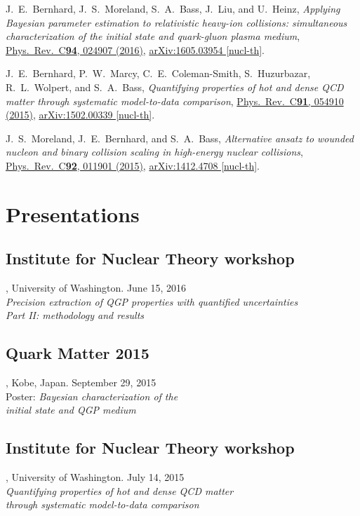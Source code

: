 \documentclass[letterpaper,10pt]{article}
\begin{document}
J.~E.~Bernhard, J.~S.~Moreland, S.~A.~Bass, J.~Liu, and U.~Heinz,
\emph{Applying Bayesian parameter estimation to relativistic heavy-ion collisions: simultaneous characterization of the initial state and quark-gluon plasma medium},
\href{http://dx.doi.org/10.1103/PhysRevC.94.024907}{Phys.\ Rev.\ C{\bf 94}, 024907 (2016)},
\href{https://arxiv.org/abs/1605.03954}{arXiv:1605.03954 [nucl-th]}.

\vspace{1em}

J.~E.~Bernhard, P.~W.~Marcy, C.~E.~Coleman-Smith, S.~Huzurbazar, R.~L.~Wolpert, and S.~A.~Bass,
\emph{Quantifying properties of hot and dense QCD matter through systematic model-to-data comparison},
\href{http://dx.doi.org/10.1103/PhysRevC.91.054910}{Phys.\ Rev.\ C{\bf 91}, 054910 (2015)},
\href{http://arxiv.org/abs/1502.00339}{arXiv:1502.00339 [nucl-th]}.

\vspace{1em}

J.~S.~Moreland, J.~E.~Bernhard, and S.~A.~Bass,
\emph{Alternative ansatz to wounded nucleon and binary collision scaling in high-energy nuclear collisions},
\href{http://dx.doi.org/10.1103/PhysRevC.92.011901}{Phys.\ Rev.\ C{\bf 92}, 011901 (2015)},
\href{http://arxiv.org/abs/1412.4708}{arXiv:1412.4708 [nucl-th]}.



\section{Presentations}


\subsection{Institute for Nuclear Theory workshop}, University of Washington. \hfill June 15, 2016 \\
\emph{Precision extraction of QGP properties with quantified uncertainties \\ Part II: methodology and results}

\subsection{Quark Matter 2015}, Kobe, Japan. \hfill September 29, 2015 \\
Poster: \emph{Bayesian characterization of the \\ initial state and QGP medium}

\subsection{Institute for Nuclear Theory workshop}, University of Washington. \hfill July 14, 2015 \\
\emph{Quantifying properties of hot and dense QCD matter \\ through systematic model-to-data comparison}
\end{document}
